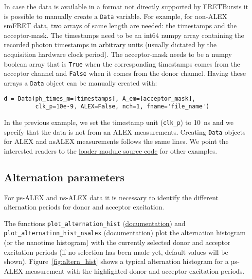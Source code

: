 In case the data is available in a format not directly supported by 
FRETBursts it is possible to manually create a \verb|Data| variable. 
For example, for non-ALEX smFRET data, two arrays of same length are 
needed: the timestamps and the acceptor-mask. The timestamps need to be 
an int64 numpy array containing the recorded photon timestamps in arbitrary 
units (usually dictated by the acquisition hardware clock period). 
The acceptor-mask needs to be a numpy boolean array that is \verb|True| 
when the corresponding timestamps comes from the acceptor channel and 
\verb|False| when it comes from the donor channel. Having these arrays a 
\verb|Data| object can be manually created with:

\begin{verbatim}
d = Data(ph_times_m=[timestamps], A_em=[acceptor_mask], 
         clk_p=10e-9, ALEX=False, nch=1, fname='file_name')
\end{verbatim}

In the previous example, we set the timestamp unit (\verb|clk_p|) to 10~ns 
and we specify that the data is not from an ALEX measurements. Creating 
\verb|Data| objects for ALEX and nsALEX measurements follows the same lines. 
We point the interested readers to the 
\href{https://github.com/tritemio/FRETBursts/blob/master/fretbursts/loader.py}{loader module source code} 
for other examples. 

\subsection{Alternation parameters}
\label{sec:alternation}

For µs-ALEX and ns-ALEX data it is necessary to identify the different 
alternation periods for donor and acceptor excitation.

The functions 
\verb|plot_alternation_hist| (\href{http://fretbursts.readthedocs.org/en/latest/plots.html#fretbursts.burst\_plot.plot\_alternation\_hist}{documentation})
and \verb|plot_alternation_hist_nsalex| (\href{http://fretbursts.readthedocs.org/en/latest/plots.html#fretbursts.burst\_plot.plot\_alternation\_hist\_nsalex}{documentation})
plot the alternation histogram (or the nanotime histogram)
with the currently selected donor and acceptor excitation periods
(if no selection has been made yet, default values will be shown).
Figure~\ref{fig:altern_hist} shows a typical alternation histogram for
a µs-ALEX measurement with the highlighted donor and acceptor excitation
periods.

